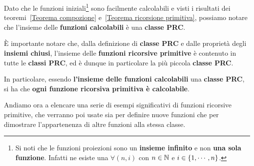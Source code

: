 
Dato che le funzioni iniziali\footnote{Si noti che le funzioni proiezioni sono un \textbf{insieme infinito} e non \textbf{una sola funzione}. Infatti ne esiste una \(\forall (n,i)\) con \( n \in \mathbb{N}\) e \( i \in \displaystyle{\left\{{1,\cdots,n}\right\}}\).} sono facilmente calcolabili e visti i risultati dei teoremi~\ref{Teorema compozione} e~\ref{Teorema ricorsione primitiva}, possiamo notare che l'insieme delle \textbf{funzioni calcolabili} è una \textbf{classe PRC}.


È importante notare che, dalla definizione di \textbf{classe PRC} e dalle proprietà degli \textbf{insiemi chiusi}, l'insieme delle \textbf{funzioni ricorsive primitive} è contenuto in tutte le \textbf{classi PRC}, ed è dunque in particolare la più piccola \textbf{classe PRC}.

In particolare, essendo \textbf{l'insieme delle funzioni calcolabili} una \textbf{classe PRC}, si ha che \textbf{ogni funzione ricorsiva primitiva è calcolabile}.

\newpage
Andiamo ora a elencare una serie di esempi significativi di funzioni ricorsive primitive, che verranno poi usate sia per definire nuove funzioni che per dimostrare l'appartenenza di altre funzioni alla stessa classe.

